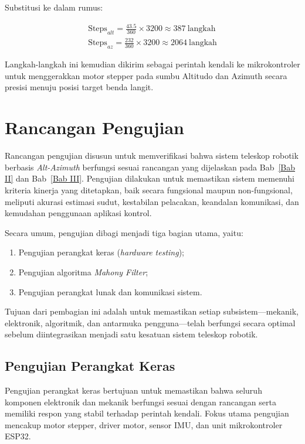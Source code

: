 Substitusi ke dalam rumus:

{\setlength{\abovedisplayskip}{8pt}%
	\setlength{\belowdisplayskip}{8pt}%
	\[
		\begin{split}
			\text{Steps}_{alt} = \frac{43.5}{360} \times 3200 \approx 387\ \text{langkah} \\
			\text{Steps}_{az} = \frac{232}{360} \times 3200 \approx 2064\ \text{langkah}
		\end{split}
	\]}

Langkah-langkah ini kemudian dikirim sebagai perintah kendali ke mikrokontroler untuk menggerakkan motor stepper pada sumbu Altitudo dan Azimuth secara presisi menuju posisi target benda langit.


\section{Rancangan Pengujian} \label{III.Rancang_Uji}
Rancangan pengujian disusun untuk memverifikasi bahwa sistem teleskop robotik berbasis \textit{Alt-Azimuth} berfungsi sesuai rancangan yang dijelaskan pada Bab~\ref{Bab II} dan Bab~\ref{Bab III}. Pengujian dilakukan untuk memastikan sistem memenuhi kriteria kinerja yang ditetapkan, baik secara fungsional maupun non-fungsional, meliputi akurasi estimasi sudut, kestabilan pelacakan, keandalan komunikasi, dan kemudahan penggunaan aplikasi kontrol. \par

Secara umum, pengujian dibagi menjadi tiga bagian utama, yaitu:
\begin{enumerate}[noitemsep]
	\item Pengujian perangkat keras (\textit{hardware testing});
	\item Pengujian algoritma \textit{Mahony Filter};
	\item Pengujian perangkat lunak dan komunikasi sistem.
\end{enumerate}

Tujuan dari pembagian ini adalah untuk memastikan setiap subsistem—mekanik, elektronik, algoritmik, dan antarmuka pengguna—telah berfungsi secara optimal sebelum diintegrasikan menjadi satu kesatuan sistem teleskop robotik.

\subsection{Pengujian Perangkat Keras}
Pengujian perangkat keras bertujuan untuk memastikan bahwa seluruh komponen elektronik dan mekanik berfungsi sesuai dengan rancangan serta memiliki respon yang stabil terhadap perintah kendali. Fokus utama pengujian mencakup motor stepper, driver motor, sensor IMU, dan unit mikrokontroler ESP32. \par

